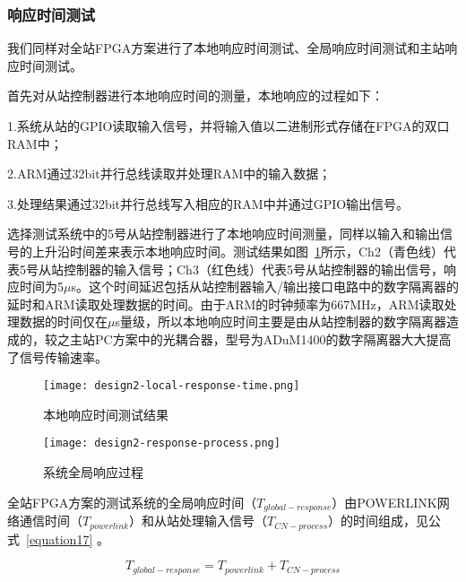 \subsubsection{响应时间测试}
\label{subsubsection:全FPGA方案的响应时间测试}
我们同样对全站FPGA方案进行了本地响应时间测试、全局响应时间测试和主站响应时间测试。

首先对从站控制器进行本地响应时间的测量，本地响应的过程如下：

1.系统从站的GPIO读取输入信号，并将输入值以二进制形式存储在FPGA的双口RAM中；

2.ARM通过32bit并行总线读取并处理RAM中的输入数据；

3.处理结果通过32bit并行总线写入相应的RAM中并通过GPIO输出信号。

选择测试系统中的5号从站控制器进行了本地响应时间测量，同样以输入和输出信号的上升沿时间差来表示本地响应时间。测试结果如图~\ref{fig:design2-local-response-time}所示，Ch2（青色线）代表5号从站控制器的输入信号；Ch3（红色线）代表5号从站控制器的输出信号，响应时间为5$\mu$s。这个时间延迟包括从站控制器输入/输出接口电路中的数字隔离器的延时和ARM读取处理数据的时间。由于ARM的时钟频率为667MHz，ARM读取处理数据的时间仅在$\mu$s量级，所以本地响应时间主要是由从站控制器的数字隔离器造成的，较之主站PC方案中的光耦合器，型号为ADuM1400的数字隔离器大大提高了信号传输速率。

\begin{figure}[!htb]
  \centering
  \texttt{[image: design2-local-response-time.png]}
  \caption{本地响应时间测试结果}
  \label{fig:design2-local-response-time}
\end{figure}

\begin{figure}[!htb]
  \centering
  \texttt{[image: design2-response-process.png]}
  \caption{系统全局响应过程}
  \label{fig:design2-response-process}
\end{figure}

全站FPGA方案的测试系统的全局响应时间（$T_{global-response}$）由POWERLINK网络通信时间（$T_{powerlink}$）和从站处理输入信号（$T_{CN-process}$）的时间组成，见公式~\ref{equation17} 。

\begin{equation}
\label{equation17}
T_{global-response}=T_{powerlink}+T_{CN-process}
\end{equation}

